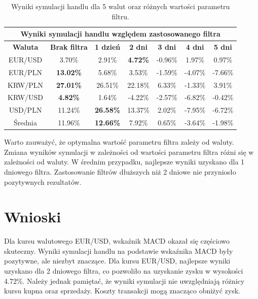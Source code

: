\documentclass[12pt, a4paper]{article}
\begin{document}
\begin{center}
    \begin{table}[ht]
        \centering
        \begin{tabular}{|c||c|c|c|c|c|c|}
            \hline
            \multicolumn{7}{|c|}{\textbf{Wyniki symulacji handlu względem zastosowanego filtra}}                                           \\
            \hline
            \textbf{Waluta} & \textbf{Brak filtra} & \textbf{1 dzień} & \textbf{2 dni}  & \textbf{3 dni} & \textbf{4 dni} & \textbf{5 dni} \\
            \hline
            EUR/USD         & 3.70\%               & 2.91\%           & \textbf{4.72\%} & -0.96\%        & 1.97\%         & 0.97\%         \\
            \hline
            EUR/PLN         & \textbf{13.02\%}     & 5.68\%           & 3.53\%          & -1.59\%        & -4.07\%        & -7.66\%        \\
            \hline
            KRW/PLN         & \textbf{27.01\%}     & 26.51\%          & 22.18\%         & 6.33\%         & -1.33\%        & 3.91\%         \\
            \hline
            KRW/USD         & \textbf{4.82\%}      & 1.64\%           & -4.22\%         & -2.57\%        & -6.82\%        & -0.42\%        \\
            \hline
            USD/PLN         & 11.24\%              & \textbf{26.58\%} & 13.37\%         & 2.02\%         & -7.95\%        & -6.72\%        \\
            \hline
            \hline
            Średnia         & 11.96\%              & \textbf{12.66\%} & 7.92\%          & 0.65\%         & -3.64\%        & -1.98\%        \\
            \hline
        \end{tabular}
        \caption{Wyniki symulacji handlu dla 5 walut oraz różnych wartości parametru filtru.}
        \label{tab:results}
    \end{table}
\end{center}

Warto zauważyć, że optymalna wartość parametru filtra zależy od waluty.
Zmiana wyników symulacji w zależności od wartości parametru filtra
różni się w zależności od waluty. W średnim przypadku, najlepsze wyniki uzyskano dla 1 dniowego filtra.
Zastosowanie filtrów dłuższych niż 2 dniowe nie przyniosło pozytywnych rezultatów.

\section{Wnioski}
Dla kursu walutowego EUR/USD, wskaźnik MACD okazał się częściowo skuteczny.
Wyniki symulacji handlu na podstawie wskaźnika MACD były pozytywne, ale niezbyt znaczące.
Dla kursu EUR/USD, najlepsze wyniki uzyskano dla 2 dniowego filtra,
co pozwoliło na uzyskanie zysku w wysokości 4.72\%. Należy jednak pamiętać, że wyniki symulacji
nie uwzględniają różnicy kursu kupna oraz sprzedaży. Koszty transakcji mogą znacząco obniżyć zysk.
\end{document}
